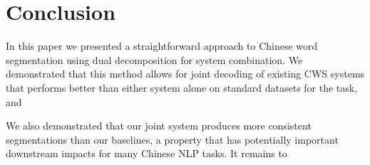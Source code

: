 \section{Conclusion}

In this paper we presented a straightforward approach to Chinese word segmentation using dual decomposition for system combination. We demonstrated that this method allows for joint decoding of existing CWS systems that performs better than either system alone on standard datasets for the task, and 

We also demonstrated that our joint system produces more consistent segmentations than our baselines, a property that has potentially important downstream impacts for many Chinese NLP tasks. It remains to 